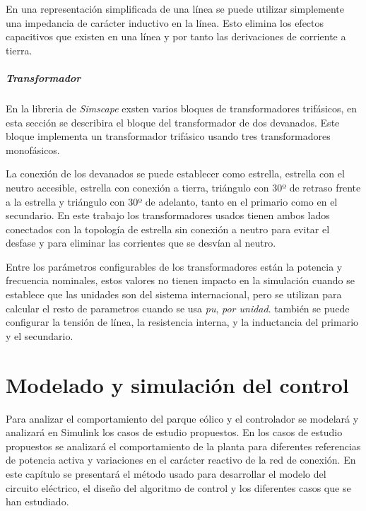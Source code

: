 \documentclass{book}
\begin{document}
En una representaci\'on simplificada de una l\'inea se puede utilizar simplemente una impedancia de car\'acter inductivo en la l\'inea. Esto elimina los efectos capacitivos que existen en una l\'inea y por tanto las derivaciones de corriente a tierra. \par 

		\paragraph{Transformador}

En la libreria de \emph{Simscape} exsten varios bloques de transformadores trif\'asicos, en esta secci\'on se describira el bloque del transformador de dos devanados. Este bloque implementa un transformador trif\'asico usando tres transformadores monof\'asicos. \par

La conexi\'on de los devanados se puede establecer como estrella, estrella con el neutro accesible, estrella con conexi\'on a tierra, tri\'angulo con 30º de retraso frente a la estrella y tri\'angulo con 30º de adelanto,  tanto en el primario como en el secundario. En este trabajo los transformadores usados tienen ambos lados conectados con la topolog\'ia de estrella sin conexi\'on a neutro para evitar el desfase y para eliminar las corrientes que se desv\'ian al neutro. \par

Entre los par\'ametros configurables de los transformadores est\'an la potencia y frecuencia nominales, estos valores no tienen impacto en la simulaci\'on cuando se establece que las unidades son del sistema internacional, pero se utilizan para calcular el resto de parametros cuando se usa \emph{pu}, \emph{por unidad}. tambi\'en se puede configurar la tensi\'on de l\'inea, la resistencia interna, y la inductancia del primario y el secundario. \par


\chapter{Modelado y simulaci\'on del control}

Para analizar el comportamiento del parque e\'olico y el controlador se modelar\'a y analizar\'a en Simulink los casos de estudio propuestos. En los casos de estudio propuestos se analizar\'a el comportamiento de la planta para diferentes referencias de potencia activa y variaciones en el car\'acter reactivo de la red de conexi\'on. En este cap\'itulo se presentar\'a el m\'etodo usado para desarrollar el modelo del circuito el\'ectrico, el diseño del algoritmo de control y los diferentes casos que se han estudiado. \par
\end{document}
